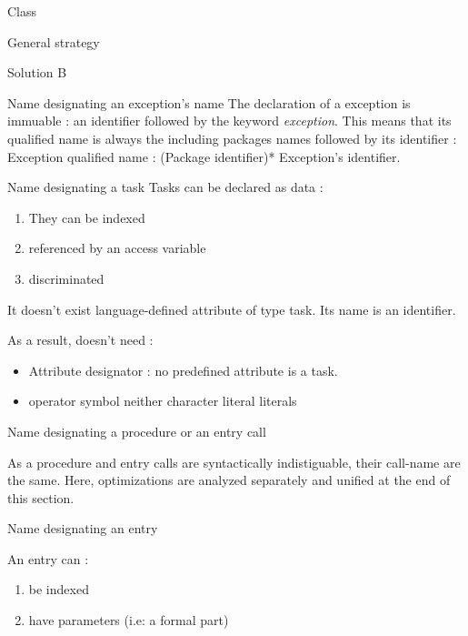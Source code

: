 \documentclass[a4paper]{prjdoc}
\begin{document}
\begin{asection}{Class }
\begin{asection}{General strategy}
\begin{asection}{Solution B}
\begin{asection}{Name designating an exception's name}
           The declaration of a exception is immuable : an identifier followed by the keyword \textit{exception}.
           This means that its qualified name is always the including packages names followed by its identifier :
           Exception qualified name : (Package identifier)* Exception's identifier.           
           \end{asection} %

           \begin{asection}{Name designating a task}
           Tasks can be declared as data :
              \begin{enumerate}
              \item They can be indexed
              \item referenced by an access variable
              \item discriminated 
              \end{enumerate}              
              
           It doesn't exist language-defined attribute of type task. 
           Its name is an identifier.
              
           As a result,  doesn't need :
              \begin{itemize}
              \item Attribute designator : no predefined attribute is a task.
              \item operator symbol neither character literal literals 
              \end{itemize}              
           \end{asection} %
           
           \begin{asection}{Name designating a procedure or an entry call}
           
           As a procedure and entry calls are syntactically indistiguable, their call-name are the same.
           Here, optimizations are analyzed separately and unified at the end of this section. 
           
              \begin{asection}{Name designating an entry}
           
              An entry can :
                 \begin{enumerate}
                 \item be indexed 
                 \item have parameters (i.e: a formal part)
                 \end{enumerate}              
              

\end{asection}
\end{asection}
\end{asection}
\end{asection}
\end{asection}
\end{document}
